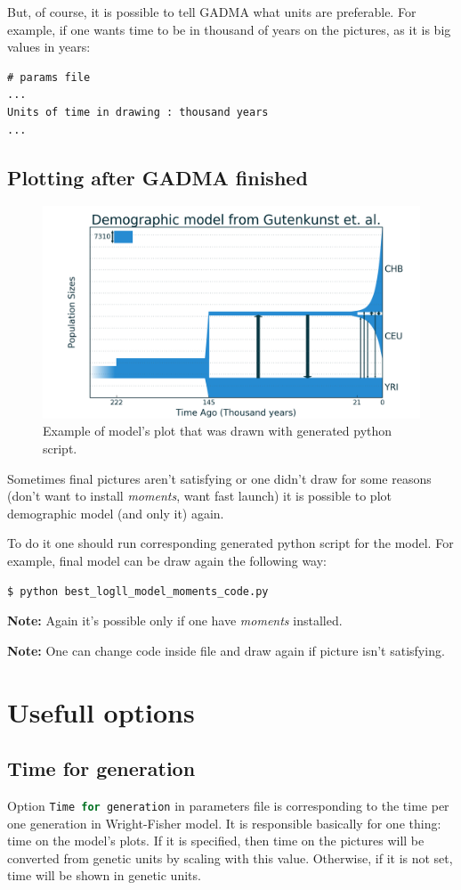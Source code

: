 \documentclass[12pt]{article}
\makeatletter
\newcommand{\moments}{\textit{moments}\xspace}
\newcommand{\py}[1]{\lstinline[language=Python, showstringspaces=False]@#1@}
\makeatother
\begin{document}
But, of course, it is possible to tell GADMA what units are preferable. For example, if one wants time to be in thousand of years on the pictures, as it is big values in years:

\begin{lstlisting}
# params file
...
Units of time in drawing : thousand years
...
\end{lstlisting}

\subsection{Plotting after GADMA finished}

\begin{figure}[h]
    \centering
    \includegraphics[width=0.6\linewidth]{3d_lim_model_dadi.png}
    \caption{Example of model's plot that was drawn with generated python script.}
    \label{fig:my_label}
\end{figure}

Sometimes final pictures aren't satisfying or one didn't draw for some reasons (don't want to install \moments, want fast launch) it is possible to plot demographic model (and only it) again.

To do it one should run corresponding generated python script for the model. For example, final model can be draw again the following way:
\begin{lstlisting}
$ python best_logll_model_moments_code.py
\end{lstlisting}

\textbf{Note: } Again it's possible only if one have \moments installed.

\textbf{Note: } One can change code inside file and draw again if picture isn't satisfying.

\section{Usefull options}
\subsection{Time for generation}
Option \py{Time for generation} in parameters file is corresponding to the time per one generation in Wright-Fisher model. It is responsible basically for one thing: time on the model's plots. If it is specified, then time on the pictures will be converted from genetic units by scaling with this value. Otherwise, if it is not set, time will be shown in genetic units. 
\end{document}
